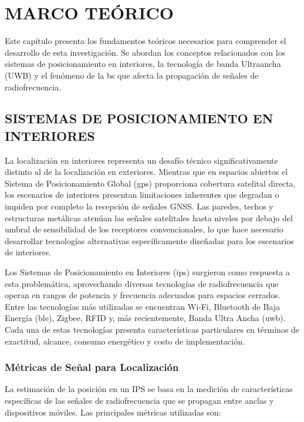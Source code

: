 \chapter{MARCO TEÓRICO}
\label{ch:marco_teorico}

Este capítulo presenta los fundamentos teóricos necesarios para comprender el desarrollo de esta investigación. Se abordan los conceptos relacionados con los sistemas de posicionamiento en interiores, la tecnología de banda Ultraancha (UWB) y el fenómeno de la \gls{bs} que afecta la propagación de señales de radiofrecuencia.

\section{SISTEMAS DE POSICIONAMIENTO EN INTERIORES}
\label{sec:sistemas_posicionamiento}

La localización en interiores representa un desafío técnico significativamente distinto al de la localización en exteriores. Mientras que en espacios abiertos el Sistema de Posicionamiento Global (\gls{gps}) proporciona cobertura satelital directa, los escenarios de interiores presentan limitaciones inherentes que degradan o impiden por completo la recepción de señales GNSS. Las paredes, techos y estructuras metálicas atenúan las señales satelitales hasta niveles por debajo del umbral de sensibilidad de los receptores convencionales, lo que hace necesario desarrollar tecnologías alternativas específicamente diseñadas para los escenarios de interiores.

Los Sistemas de Posicionamiento en Interiores (\gls{ips}) surgieron como respuesta a esta problemática, aprovechando diversas tecnologías de radiofrecuencia que operan en rangos de potencia y frecuencia adecuados para espacios cerrados. Entre las tecnologías más utilizadas se encuentran Wi-Fi, Bluetooth de Baja Energía (\gls{ble}), Zigbee, RFID y, más recientemente, Banda Ultra Ancha (\gls{uwb}). Cada una de estas tecnologías presenta características particulares en términos de exactitud, alcance, consumo energético y costo de implementación.

\subsection{Métricas de Señal para Localización}

La estimación de la posición en un IPS se basa en la medición de características específicas de las señales de radiofrecuencia que se propagan entre anclas y dispositivos móviles. Las principales métricas utilizadas son:

